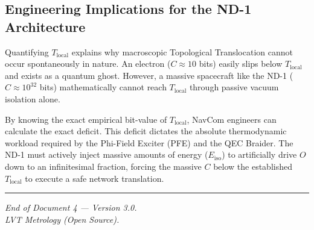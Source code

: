 \documentclass[12pt,a4paper]{article}
\begin{document}
\subsection{Engineering Implications for the ND-1 Architecture}
Quantifying $T_{\mathrm{local}}$ explains why macroscopic Topological Translocation cannot occur spontaneously in nature. An electron ($C \approx 10$ bits) easily slips below $T_{\mathrm{local}}$ and exists as a quantum ghost. However, a massive spacecraft like the ND-1 ($C \approx 10^{32}$ bits) mathematically cannot reach $T_{\mathrm{local}}$ through passive vacuum isolation alone. 

By knowing the exact empirical bit-value of $T_{\mathrm{local}}$, NavCom engineers can calculate the exact deficit. This deficit dictates the absolute thermodynamic workload required by the Phi-Field Exciter (PFE) and the QEC Braider. The ND-1 must actively inject massive amounts of energy ($E_{\mathrm{iso}}$) to artificially drive $O$ down to an infinitesimal fraction, forcing the massive $C$ below the established $T_{\mathrm{local}}$ to execute a safe network translation.

\vspace{2em}
\hrule
\vspace{0.5em}
\begin{center}
\small\textit{End of Document 4 --- Version 3.0. \\
LVT Metrology (Open Source).}
\end{center}
\end{document}
